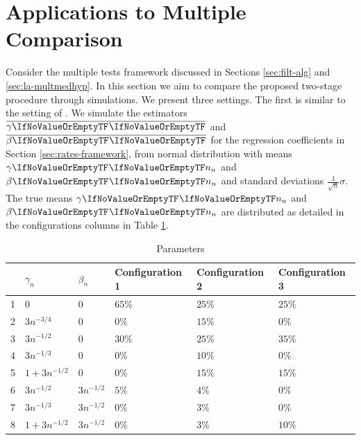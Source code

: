 \documentclass[ejs, twoside]{imsart}
\theoremstyle{plain}
\theoremstyle{remark}
\newcommand{\estim}[1]{\avg{\regcoef{#1}}}
\numberwithin{equation}{section}
\numberwithin{table}{section}
\numberwithin{figure}{section}
\begin{document}

\section{Applications to Multiple Comparison} \label{appmc}


Consider the multiple tests framework discussed in Sections \ref{sec:filt-alg} and \ref{sec:la-multmedhyp}. In this section we aim to compare the proposed two-stage procedure through simulations. We present three settings. The first is similar to the setting of \citet{djordjilovic_optimal_2020}. We simulate the estimators \(\estim{1}\) and \(\estim{2}\) for the regression coefficients in Section \ref{sec:rates-framework}, from normal distribution with means \(\regcoef{1}[][n]\) and \(\regcoef{2}[][n]\) and standard deviations \(\frac{1}{\sqrt{n}} \sigma\).
The true means \(\regcoef{1}[][n]\) and \(\regcoef{2}[][n]\) are distributed as detailed in the configurations columns in Table \ref{tbl:param}.
\begin{table}[ht]
\centering
\begin{tabular}{rlllll}
  \hline
 & \(\gamma_n\) & \(\beta_n\) & Configuration 1 & Configuration 2 & Configuration 3 \\ 
  \hline
1 & \(0\) & \(0\) & \(65\%\) & \(25\%\) & \(25\%\) \\ 
  2 & \(3 n^{-3/4}\) & \(0\) & \(0\%\) & \(15\%\) & \(0\%\) \\ 
  3 & \(3 n^{-1/2}\) & \(0\) & \(30\%\) & \(25\%\) & \(35\%\) \\ 
  4 & \(3 n^{-1/3}\) & \(0\) & \(0\%\) & \(10\%\) & \(0\%\) \\ 
  5 & \(1 + 3 n^{-1/2}\) & \(0\) & \(0\%\) & \(15\%\) & \(15\%\) \\ 
  6 & \(3 n^{-1/2}\) & \(3 n^{-1/2}\) & \(5\%\) & \(4\%\) & \(0\%\) \\ 
  7 & \(3 n^{-1/3}\) & \(3 n^{-1/2}\) & \(0\%\) & \(3\%\) & \(0\%\) \\ 
  8 & \(1 + 3 n^{-1/2}\) & \(3 n^{-1/2}\) & \(0\%\) & \(3\%\) & \(10\%\) \\ 
   \hline
\end{tabular}
\caption{Parameters} 
\label{tbl:param}
\end{table}
\end{document}
